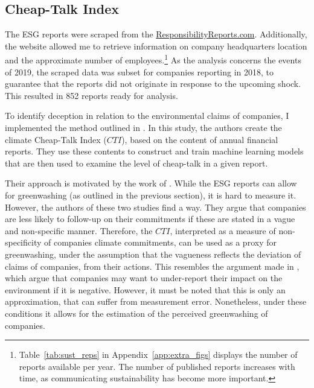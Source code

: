 \documentclass[12pt]{article}
\begin{document}
\subsection{Cheap-Talk Index}

The ESG reports were scraped from the \href{https://responsibilityreports.com}{ResponsibilityReports.com}. Additionally, the website allowed me to retrieve information on company headquarters location and the approximate number of employees.\footnote{Table~\ref{tab:sust_reps} in Appendix~\ref{app:extra_figs} displays the number of reports available per year. The number of published reports increases with time, as communicating sustainability has become more important.} As the analysis concerns the events of 2019, the scraped data was subset for companies reporting in 2018, to guarantee that the reports did not originate in response to the upcoming shock. This resulted in 852 reports ready for analysis. 

To identify deception in relation to the environmental claims of companies, I implemented the method outlined in \textcite{binglerHowCheapTalk2024}. In this study, the authors create the climate Cheap-Talk Index ($CTI$), based on the content of annual financial reports. They use these contents to construct and train machine learning models that are then used to examine the level of cheap-talk in a given report. 

Their approach is motivated by the work of \textcite{coenAreCorporateClimate2022, ramusWhenAreCorporate2005}. While the ESG reports can allow for greenwashing (as outlined in the previous section), it is hard to measure it. However, the authors of these two studies find a way. They argue that companies are less likely to follow-up on their commitments if these are stated in a vague and non-specific manner. Therefore, the $CTI$, interpreted as a measure of non-specificity of companies climate commitments, can be used as a proxy for greenwashing, under the assumption that the vagueness reflects the deviation of claims of companies, from their actions. This resembles the argument made in \textcite{binglerCheapTalkCherrypicking2022,marquisScrutinyNormsSelective2016}, which argue that companies may want to under-report their impact on the environment if it is negative. However, it must be noted that this is only an approximation, that can suffer from measurement error. Nonetheless, under these conditions it allows for the estimation of the perceived greenwashing of companies. 
\end{document}
